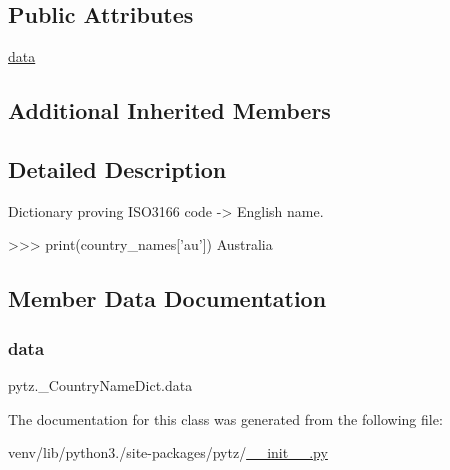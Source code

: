 \subsection*{Public Attributes}
\begin{DoxyCompactItemize}
\item 
\hyperlink{classpytz_1_1__CountryNameDict_acbf6ba2ddb0b326e72e9c3ec24418e8d}{data}
\end{DoxyCompactItemize}
\subsection*{Additional Inherited Members}


\subsection{Detailed Description}
\begin{DoxyVerb}Dictionary proving ISO3166 code -> English name.

>>> print(country_names['au'])
Australia
\end{DoxyVerb}
 

\subsection{Member Data Documentation}
\mbox{\label{classpytz_1_1__CountryNameDict_acbf6ba2ddb0b326e72e9c3ec24418e8d}} 
\subsubsection{\texorpdfstring{data}{data}}
{\footnotesize\ttfamily pytz.\+\_\+\+Country\+Name\+Dict.\+data}



The documentation for this class was generated from the following file\+:\begin{DoxyCompactItemize}
\item 
venv/lib/python3./site-\/packages/pytz/\hyperlink{venv_2lib_2python3_89_2site-packages_2pytz_2____init_____8py}{\+\_\+\+\_\+init\+\_\+\+\_\+.\+py}\end{DoxyCompactItemize}
